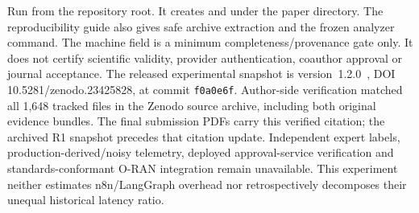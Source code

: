 \begin{revision}
Run 
from the repository root. It creates
 and
 under the paper
directory. The reproducibility guide also gives safe archive extraction and
the frozen analyzer command. The machine field
 is a minimum
completeness/provenance gate only. It does not certify scientific validity,
provider authentication, coauthor approval or journal acceptance.
The released experimental snapshot is version~1.2.0~\cite{artifact},
DOI 10.5281/zenodo.23425828, at commit \texttt{f0a0e6f}. Author-side
verification matched all 1,648 tracked files in the Zenodo source archive,
including both original evidence bundles. The final submission PDFs carry
this verified citation; the archived R1 snapshot precedes that citation
update.
Independent expert labels, production-derived/noisy telemetry, deployed
approval-service verification and standards-conformant O-RAN integration
remain unavailable. This experiment neither estimates n8n/LangGraph overhead
nor retrospectively decomposes their unequal historical latency ratio.
\end{revision}
